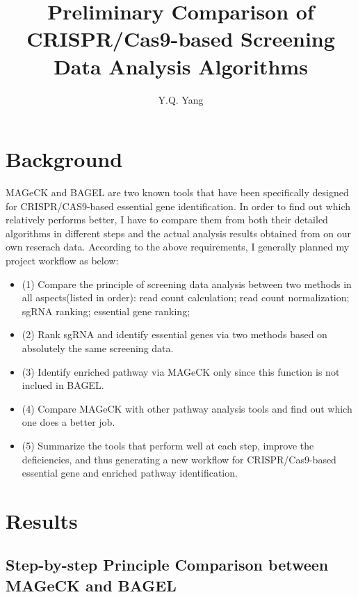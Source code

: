 \documentclass[fleqn,10pt]{wlscirep}
\title{Preliminary Comparison of CRISPR/Cas9-based Screening Data Analysis Algorithms}
\author[1,*]{Y.Q. Yang}
\begin{document}
\flushbottom
\maketitle

\thispagestyle{empty}

\section*{Background}

MAGeCK and BAGEL are two known tools that have been specifically designed for CRISPR/CAS9-based essential gene identification. In order to find out which relatively performs better, I have to compare them from both their detailed algorithms in different steps and the actual analysis results obtained from on our own reserach data.  According to the above requirements, I generally planned my project workflow as below:

\begin{itemize}
    \item (1) Compare the principle of screening data analysis between two methods in all aspects(listed in order):
        \subitem read count calculation;
        \subitem read count normalization;
        \subitem sgRNA ranking;
        \subitem essential gene ranking;
    \item (2) Rank sgRNA and identify essential genes via two methods based on absolutely the same screening data.
    \item (3) Identify enriched pathway via MAGeCK only since this function is not inclued in BAGEL.
    \item (4) Compare MAGeCK with other pathway analysis tools and find out which one does a better job.
    \item (5) Summarize the tools that perform well at each step, improve the deficiencies, and thus generating a new workflow for CRISPR/Cas9-based essential gene and enriched pathway identification.
    \end{itemize}

\section*{Results}

\subsection*{Step-by-step Principle Comparison between MAGeCK and BAGEL}
\end{document}
